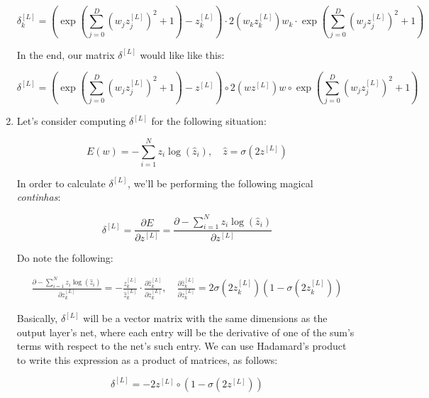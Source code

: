 \documentclass[12pt]{article}
\begin{document}
\begin{enumerate}
{              \begin{equation*}
                \delta_k^{[L]} = \left(\exp\left(\sum_{j=0}^D (w_j z_j^{[L]})^2 + 1\right) - z_k^{[L]}\right) \cdot 2 (w_k z_k^{[L]}) w_k \cdot \exp\left(\sum_{j=0}^D (w_j z_j^{[L]})^2 + 1\right)
              \end{equation*}

              In the end, our matrix $\delta^{[L]}$ would like like this:

              \begin{equation*}
                \delta^{[L]} = \left(\exp\left(\sum_{j=0}^D (w_j z_j^{[L]})^2 + 1\right) - z^{[L]}\right) \circ 2 (w z^{[L]}) w \circ \exp\left(\sum_{j=0}^D (w_j z_j^{[L]})^2 + 1\right)
              \end{equation*}

        }

  \item {
        Let's consider computing $\delta^{[L]}$ for the following situation:

        \begin{equation*}
          E(w) = - \sum_{i=1}^N z_i \log(\hat{z}_i), \quad \hat{z} = \sigma(2 z^{[L]})
        \end{equation*}

        In order to calculate $\delta^{[L]}$, we'll be performing the
        following magical \textit{continhas}:

        $$
          \delta^{[L]} = \frac{\partial E}{\partial z^{[L]}}
          = \frac{\partial -\sum_{i=1}^N z_i \log(\hat{z}_i)}{\partial z^{[L]}}
        $$

        Do note the following:

        \begin{align*}
          \frac{\partial -\sum_{i=1}^N z_i \log(\hat{z}_i)}{\partial z_k^{[L]}}
          = - \frac{z_k^{[L]}}{\hat{z}_k^{[L]}} \cdot \frac{\partial \hat{z}_k^{[L]}}{\partial z_k^{[L]}}, \quad
          \frac{\partial \hat{z}_k^{[L]}}{\partial z_k^{[L]}} = 2 \sigma(2 z_k^{[L]}) (1 - \sigma(2 z_k^{[L]}))
        \end{align*}

        Basically, $\delta^{[L]}$ will be a vector matrix with the same dimensions
        as the output layer's net, where each entry will be the derivative of
        one of the sum's terms with respect to the net's such entry.
        We can use Hadamard's product to write this expression as a product
        of matrices, as follows:

        \begin{equation*}
          \delta^{[L]} = -2z^{[L]} \circ (1 - \sigma(2 z^{[L]}))
        \end{equation*}

        }
\end{enumerate}
\end{document}
